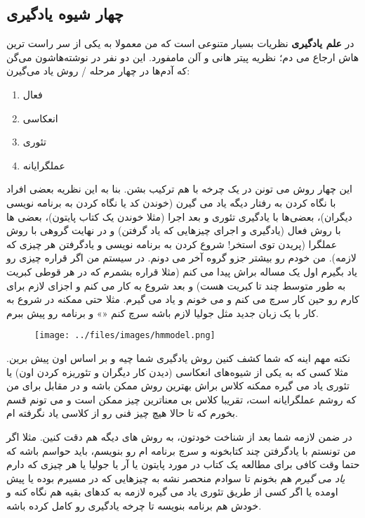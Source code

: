 \subsection*{چهار شیوه یادگیری}
در
\textbf{علم یادگیری}
نظریات بسیار متنوعی است که من معمولا به یکی از سر راست ترین هاش ارجاع می دم؛ نظریه پیتر هانی و آلن مامفورد. این دو نفر در نوشته‌هاشون می‌گن که آدم‌ها در چهار مرحله / روش یاد می‌گیرن:
\begin{enumerate}
	\item فعال
	\item انعکاسی
	\item تئوری
	\item عملگرایانه
\end{enumerate}
این چهار روش می تونن در یک چرخه با هم ترکیب بشن. بنا به این نظریه بعضی افراد با نگاه کردن به رفتار دیگه یاد می گیرن (خوندن کد یا نگاه کردن به برنامه نویسی دیگران)، بعضی‌ها با یادگیری تئوری و بعد اجرا (مثلا خوندن یک کتاب پایتون)، بعضی ها با روش فعال (یادگیری و اجرای چیزهایی که یاد گرفتن) و در نهایت گروهی با روش عملگرا (پریدن توی استخر! شروع کردن به برنامه نویسی و یادگرفتن هر چیزی که لازمه). من خودم رو بیشتر جزو گروه آخر می دونم. در سیستم من اگر قراره چیزی رو یاد بگیرم اول یک مساله براش پیدا می کنم (مثلا قراره بشمرم که در هر قوطی کبریت به طور متوسط چند تا کبریت هست) و بعد شروع به کار می کنم و اجزای لازم برای کارم رو حین کار سرچ می کنم و می خونم و یاد می گیرم. مثلا حتی ممکنه در شروع به کار با یک زبان جدید مثل جولیا لازم باشه سرچ کنم «» و برنامه رو پیش ببرم.

\begin{figure}[h]
	\begin{center}
		\texttt{[image: ../files/images/hmmodel.png]}
	\end{center}
\end{figure}
نکته مهم اینه که شما کشف کنین روش یادگیری شما چیه و بر اساس اون پیش برین. مثلا کسی که به یکی از شیوه‌های انعکاسی (دیدن کار دیگران و تئوریزه کردن اون) یا تئوری یاد می گیره ممکنه کلاس براش بهترین روش ممکن باشه و در مقابل برای من که روشم عملگرایانه است، تقریبا کلاس بی معناترین چیز ممکن است و می تونم قسم بخورم که تا حالا هیچ چیز فنی رو از کلاسی یاد نگرفته ام.

در ضمن لازمه شما بعد از شناخت خودتون، به روش های دیگه هم دقت کنین. مثلا اگر من تونستم با یادگرفتن چند کتابخونه و سرچ برنامه ام رو بنویسم، باید حواسم باشه که حتما وقت کافی برای مطالعه یک کتاب در مورد پایتون یا آر یا جولیا یا هر چیزی که دارم
\emph{یاد می گیرم}
هم بخونم تا سوادم منحصر نشه به چیزهایی که در مسیرم بوده یا پیش اومده یا اگر کسی از طریق تئوری یاد می گیره لازمه به کدهای بقیه هم نگاه کنه و خودش هم برنامه بنویسه تا چرخه یادگیری رو کامل کرده باشه.

